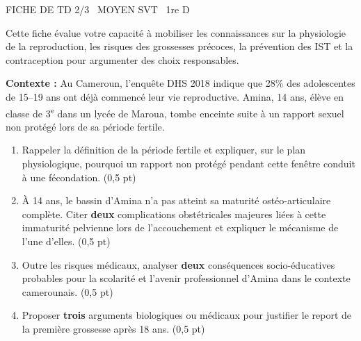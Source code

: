 \documentclass[11pt]{article}
\begin{document}
\begin{tcolorbox}[enhanced,colback=popink,colframe=popink,arc=10pt,boxrule=0pt,left=12pt,right=12pt,top=9pt,bottom=9pt]
{\color{white}\popxbold\small FICHE DE TD 2/3 \textbullet\ MOYEN \hfill SVT \textbullet\ 1re D\par}
\end{tcolorbox}
\vspace{4pt}
Cette fiche évalue votre capacité à mobiliser les connaissances sur la physiologie de la reproduction, les risques des grossesses précoces, la prévention des IST et la contraception pour argumenter des choix responsables.

\begin{exercice}
\textbf{Contexte :} Au Cameroun, l'enquête DHS 2018 indique que 28\% des adolescentes de 15--19 ans ont déjà commencé leur vie reproductive. Amina, 14 ans, élève en classe de 3\textsuperscript{e} dans un lycée de Maroua, tombe enceinte suite à un rapport sexuel non protégé lors de sa période fertile.

\begin{enumerate}
    \item Rappeler la définition de la période fertile et expliquer, sur le plan physiologique, pourquoi un rapport non protégé pendant cette fenêtre conduit à une fécondation. (0,5 pt)
    \item À 14 ans, le bassin d'Amina n'a pas atteint sa maturité ostéo-articulaire complète. Citer \textbf{deux} complications obstétricales majeures liées à cette immaturité pelvienne lors de l'accouchement et expliquer le mécanisme de l'une d'elles. (0,5 pt)
    \item Outre les risques médicaux, analyser \textbf{deux} conséquences socio-éducatives probables pour la scolarité et l'avenir professionnel d'Amina dans le contexte camerounais. (0,5 pt)
    \item Proposer \textbf{trois} arguments biologiques ou médicaux pour justifier le report de la première grossesse après 18 ans. (0,5 pt)
\end{enumerate}
\end{exercice}
\end{document}
